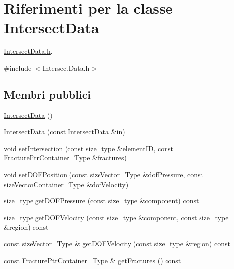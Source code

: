 \hypertarget{classIntersectData}{\section{Riferimenti per la classe Intersect\-Data}
\label{classIntersectData}
}


\hyperlink{IntersectData_8h}{Intersect\-Data.\-h}.  




{\ttfamily \#include $<$Intersect\-Data.\-h$>$}

\subsection*{Membri pubblici}
\begin{DoxyCompactItemize}
\item 
\hyperlink{classIntersectData_ac86ac869672ccd193327ce246e7969d6}{Intersect\-Data} ()
\item 
\hyperlink{classIntersectData_a731a27ad828cdc8146679a292cbd4582}{Intersect\-Data} (const \hyperlink{classIntersectData}{Intersect\-Data} \&in)
\item 
void \hyperlink{classIntersectData_a306be572e6e9a2359310ba908e693b2e}{set\-Intersection} (const size\-\_\-type \&element\-I\-D, const \hyperlink{FractureHandler_8h_a2f0b57e18ecf89912d7de0c87158009e}{Fracture\-Ptr\-Container\-\_\-\-Type} \&fractures)
\item 
void \hyperlink{classIntersectData_ac4e5826b88471e0f1514cae82c49bcae}{set\-D\-O\-F\-Position} (const \hyperlink{Core_8h_a83c51913d041a5001e8683434c09857f}{size\-Vector\-\_\-\-Type} \&dof\-Pressure, const \hyperlink{Core_8h_a80e8381d86ecb0a7f4f87ff84d1a0be5}{size\-Vector\-Container\-\_\-\-Type} \&dof\-Velocity)
\item 
size\-\_\-type \hyperlink{classIntersectData_a50b33fda9608ffc678057b08e7aed405}{get\-D\-O\-F\-Pressure} (const size\-\_\-type \&component) const 
\item 
size\-\_\-type \hyperlink{classIntersectData_a8a5946e35f80576da495a107464cd2cb}{get\-D\-O\-F\-Velocity} (const size\-\_\-type \&component, const size\-\_\-type \&region) const 
\item 
const \hyperlink{Core_8h_a83c51913d041a5001e8683434c09857f}{size\-Vector\-\_\-\-Type} \& \hyperlink{classIntersectData_ae4cc921b5f9bee74c9a20b25ae7a6f37}{get\-D\-O\-F\-Velocity} (const size\-\_\-type \&region) const 
\item 
const \hyperlink{FractureHandler_8h_a2f0b57e18ecf89912d7de0c87158009e}{Fracture\-Ptr\-Container\-\_\-\-Type} \& \hyperlink{classIntersectData_a1c43bd327ed8dedaa89870f60cdb4606}{get\-Fractures} () const 

\end{DoxyCompactItemize}

